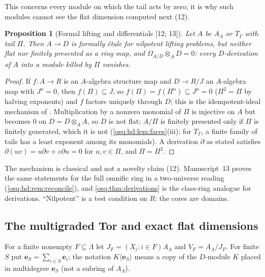 \documentclass[11pt,letterpaper]{article}
\numberwithin{equation}{section}
\newtheorem{proposition}[proposition]{Proposition}
\theoremstyle{definition}
\theoremstyle{remark}
\theoremstyle{plain}
\newcommand{\src}[1]{\textup{\textsf{[#1]}}}
\begin{document}
This concerns every module on which the tail acts by zero; it is why such modules cannot see the flat dimension
computed next (12).

\begin{proposition}[Formal lifting and differentials \src{12; 13}]\label{osq:hd:prop:etale}
Let $A$ be $A_\Lambda$ or $T_\Gamma$ with tail $\Pi$. Then $A\to D$ is formally \'etale for nilpotent lifting
problems, but neither flat nor finitely presented as a ring map, and $\Omega_{A/D}\otimes_AD=0$: every
$D$-derivation of $A$ into a module killed by $\Pi$ vanishes.
\end{proposition}
\begin{proof}
If $f:A\to R$ is an $A$-algebra structure map and $D\to R/J$ an $A$-algebra map with $J^n=0$, then $f(\Pi)\subseteq J$,
so $f(\Pi)=f(\Pi^n)\subseteq J^n=0$ ($\Pi^2=\Pi$ by halving exponents) and $f$ factors uniquely through $D$; this is
the idempotent-ideal mechanism of \cite[Tag~060H]{StacksFormal}. Multiplication by a nonzero monomial of $\Pi$ is
injective on $A$ but becomes $0$ on $D=D\otimes_AA$, so $D$ is not flat; $A/\Pi$ is finitely presented only if $\Pi$ is
finitely generated, which it is not (\cref{osq:hd:lem:faces}(iii); for $T_\Gamma$, a finite family of tails has a least
exponent among its monomials). A derivation $\partial$ as stated satisfies $\partial(uv)=u\partial v+v\partial u=0$ for
$u,v\in\Pi$, and $\Pi=\Pi^2$.
\end{proof}

The mechanism is classical and not a novelty claim (12). Manuscript~13 proves the same statements for the full
omnific ring in a two-universe reading (\cref{osq:hd:rem:reconcile}), and \cref{osq:thm:derivations} is the
class-ring analogue for derivations. ``Nilpotent'' is a test condition on $R$: the cores are domains.

\subsection{The multigraded Tor and exact flat dimensions}\label{osq:hd:sub:tor}

For a finite nonempty $F\subseteq\Lambda$ let $J_F=(X_i:i\in F)A_\Lambda$ and $V_F=A_\Lambda/J_F$. For finite $S$ put
$\mathbf e_S=\sum_{i\in S}\mathbf e_i$; the notation $K\langle\mathbf e_S\rangle$ means a copy of the $D$-module $K$
placed in multidegree $\mathbf e_S$ (not a subring of $A_\Lambda$).
\end{document}
